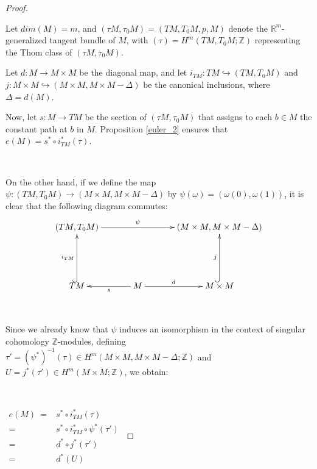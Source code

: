 \documentclass[12pt,oneside]{book}
\newcommand{\R}{\mathbb{R}}
\newcommand{\Z}{\mathbb{Z}}
\begin{document}
    \begin{proof}

        \

        Let $dim(M) = m$, and $(\tau M,\tau_{0}M) = (TM,T_{0}M,p,M)$ denote the $\R^{m}$-generalized tangent 
        bundle of $M$, with $(\tau) = H^{m}(TM,T_{0}M;\Z)$ representing the Thom 
        class of $(\tau M,\tau_{0}M)$.
        
        Let $d:M \to M \times M$ be the diagonal map, and let $i_{TM}: TM \hookrightarrow (TM,T_{0}M)$ and 
        $j: M \times M \hookrightarrow (M \times M, M \times M - \Delta)$ be the canonical inclusions, where $\Delta = d(M)$.

        Now, let $s: M \to TM$ be the section of $(\tau M,\tau_{0}M)$ that assigns to each $b \in M$ the constant path at $b$ 
        in $M$. Proposition \ref{euler_2} ensures that $e(M) = s^{*} \circ i_{TM}^{*}(\tau)$.

        \

        On the other hand, if we define the map $\psi: (TM,T_{0}M) \to (M \times M, M \times M - \Delta)$ by 
        $\psi(\omega) = (\omega(0), \omega(1))$, it is clear that the following diagram commutes:
        $$ \xymatrix @C=0.5cm {
        	(TM,T_{0}M) \ar[rrrr]^-{\psi} &&&& (M\times M,M\times M-\Delta) \\
        	&&&& \\	
        	TM \ar@{^(->}[uu]^-{i_{TM}} && M \ar[ll]^-{s} \ar[rr]^-{d} && M\times M \ar@{^(->}[uu]^-{j} \\
        } $$

        \

        Since we already know that $\psi$ induces an isomorphism in the context of singular cohomology $\Z$-modules, defining 
        $\tau' = (\psi^{*})^{-1}(\tau) \in H^{m}(M \times M, M \times M - \Delta; \Z)$ and $U = j^{*}(\tau') \in H^{m}(M \times M; \Z)$, we 
        obtain:

        \

        $ \begin{array}{rl}
        	e(M) \ = & s^{*} \circ i_{TM}^{*}(\tau) \\
        	= & s^{*} \circ i_{TM}^{*} \circ \psi^{*}(\tau') \\
        	= & d^{*} \circ j^{*}(\tau') \\
        	= & d^{*}(U)
        \end{array} $


\end{proof}
\end{document}
